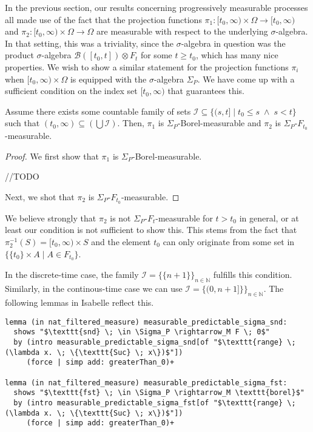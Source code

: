 In the previous section, our results concerning progressively measurable processes all made use of the fact that the projection functions $\pi_1 : [t_0, \infty) \times \Omega \rightarrow [t_0, \infty)$ and $\pi_2 : [t_0, \infty) \times \Omega \rightarrow \Omega$ are measurable with respect to the underlying $\sigma$-algebra. In that setting, this was a triviality, since the $\sigma$-algebra in question was the product $\sigma$-algebra $\mathcal{B}([t_0, t]) \otimes F_t$ for some $t \ge t_0$, which has many nice properties. We wish to show a similar statement for the projection functions $\pi_i$ when $[t_0, \infty) \times \Omega$ is equipped with the $\sigma$-algebra $\Sigma_P$. We have come up with a sufficient condition on the index set $[t_0, \infty)$ that guarantees this.

\begin{lemma}
	Assume there exists some countable family of sets $\mathcal{I} \subseteq \{(s, t] \;\vert\; t_0 \le s \;\wedge\; s < t\}$ such that $(t_0, \infty) \subseteq (\bigcup \mathcal{I})$. Then, $\pi_1$ is $\Sigma_P$-Borel-measurable and $\pi_2$ is $\Sigma_P$-$F_{t_0}$-measurable.
\end{lemma}
\begin{proof}
	We first show that $\pi_1$ is $\Sigma_P$-Borel-measurable.
	
	//TODO
	
	Next, we shot that $\pi_2$ is $\Sigma_P$-$F_{t_0}$-measurable.
\end{proof}

\begin{remark}
	We believe strongly that $\pi_2$ is not $\Sigma_P$-$F_{t}$-measurable for $t > t_0$ in general, or at least our condition is not sufficient to show this. This stems from the fact that $\pi_2^{-1}(S) = [t_0, \infty) \times S$ and the element $t_0$ can only originate from some set in $\{\{t_0\} \times A \;\vert\; A \in F_{t_0}\}$.
\end{remark}

In the discrete-time case, the family $\mathcal{I} = \{\{n + 1\}\}_{n \in \mathbb{N}}$ fulfills this condition. Similarly, in the continous-time case we can use $\mathcal{I} = \{(0,n + 1]\}\}_{n \in \mathbb{N}}$. The following lemmas in Isabelle reflect this.

\begin{isalemma}
{\small
\begin{lstlisting}[style=isabelle]
lemma (in nat_filtered_measure) measurable_predictable_sigma_snd:
  shows "$\texttt{snd} \; \in \Sigma_P \rightarrow_M F \; 0$"
  by (intro measurable_predictable_sigma_snd[of "$\texttt{range} \; (\lambda x. \; \{\texttt{Suc} \; x\})$"]) 
	 (force | simp add: greaterThan_0)+

lemma (in nat_filtered_measure) measurable_predictable_sigma_fst:
  shows "$\texttt{fst} \; \in \Sigma_P \rightarrow_M \texttt{borel}$"
  by (intro measurable_predictable_sigma_fst[of "$\texttt{range} \; (\lambda x. \; \{\texttt{Suc} \; x\})$"]) 
	 (force | simp add: greaterThan_0)+
\end{lstlisting}
}
\end{isalemma}

